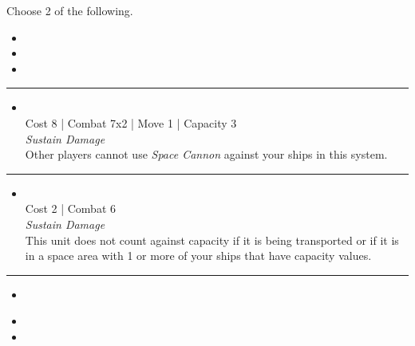 \begin{multicols}{2}
Choose 2 of the following.

\begin{itemize}
\item \neural
\item \sarween
\item \plasma
\end{itemize}

\vspace{-10pt}\rule{\hsize}{0.4pt}\vspace{5pt}


\begin{itemize}
\item {}\\
Cost 8 | Combat 7x2 | Move 1 | Capacity 3 \\
\emph{Sustain Damage}\\
Other players cannot use \emph{Space Cannon} against your ships in this system.
\end{itemize}

\vspace{-10pt}\rule{\hsize}{0.4pt}\vspace{5pt}


\begin{itemize}
\item {}
\\
Cost 2 | Combat 6 \\
\emph{Sustain Damage}\\
This unit does not count against capacity if it is being transported or if it is in a space area with 1 or more of your ships that have capacity values.
\end{itemize}

\vspace{-10pt}\rule{\hsize}{0.4pt}\vspace{5pt}


\begin{itemize}
\item \strikeWingI
\end{itemize}

\columnbreak
{}

\begin{itemize}
\item \strikeWingII
\item \hololattice
\end{itemize}


\end{multicols}
